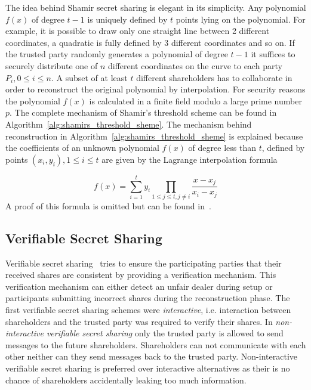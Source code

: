 The idea behind Shamir secret sharing is elegant in its simplicity. Any polynomial $f \left( x \right)$ of degree $t-1$ is uniquely defined by $t$ points lying on the polynomial. For example, it is possible to draw only one straight line between 2 different coordinates, a quadratic is fully defined by 3 different coordinates and so on. If the trusted party randomly generates a polynomial of degree $t-1$ it suffices to securely distribute one of $n$ different coordinates on the curve to each party $P_i, 0 \leq i \leq n$. A subset of at least $t$ different shareholders has to collaborate in order to reconstruct the original polynomial by interpolation. For security reasons the polynomial $f \left( x \right)$ is calculated in a finite field modulo a large prime number $p$. The complete mechanism of Shamir's threshold scheme can be found in Algorithm~\ref{alg:shamirs_threshold_sheme}. The mechanism behind reconstruction in Algorithm~\ref{alg:shamirs_threshold_sheme} is explained because the coefficients of an unknown polynomial $f \left( x \right)$ of degree less than $t$, defined by points $\left( x_i, y_i \right), 1 \leq i \leq t$ are given by the Lagrange interpolation formula

\begin{equation*}
 f \left( x \right) = \sum^t_{i=1}y_i \prod_{1 \leq j \leq t, j \neq i} \frac{x-x_j}{x_i-x_j}
\end{equation*}
A proof of this formula is omitted but can be found in~\cite{site:proofwiki_lagrange}.

\subsection{Verifiable Secret Sharing}
Verifiable secret sharing~\cite{art:ChorGMA85} tries to ensure the participating parties that their received shares are consistent by providing a verification mechanism. This verification mechanism can either detect an unfair dealer during setup or participants submitting incorrect shares during the reconstruction phase. The first verifiable secret sharing schemes were \textit{interactive}, i.e. interaction between shareholders and the trusted party was required to verify their shares. In \textit{non-interactive verifiable secret sharing} only the trusted party is allowed to send messages to the future shareholders. Shareholders can not communicate with each other neither can they send messages back to the trusted party. Non-interactive verifiable secret sharing is preferred over interactive alternatives as their is no chance of shareholders accidentally leaking too much information.

